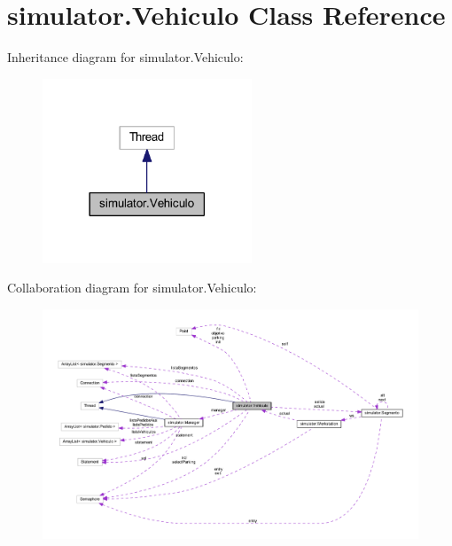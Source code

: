 \hypertarget{classsimulator_1_1_vehiculo}{}\section{simulator.\+Vehiculo Class Reference}
\label{classsimulator_1_1_vehiculo}


Inheritance diagram for simulator.\+Vehiculo\+:\nopagebreak
\begin{figure}[H]
\begin{center}
\leavevmode
\includegraphics[width=177pt]{classsimulator_1_1_vehiculo__inherit__graph}
\end{center}
\end{figure}


Collaboration diagram for simulator.\+Vehiculo\+:\nopagebreak
\begin{figure}[H]
\begin{center}
\leavevmode
\includegraphics[width=350pt]{classsimulator_1_1_vehiculo__coll__graph}
\end{center}
\end{figure}
